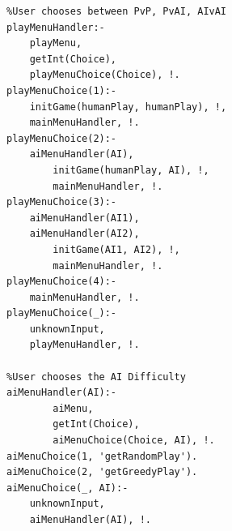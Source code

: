 \documentclass[a4paper]{article}
\begin{document}
\begin{lstlisting}
%User chooses between PvP, PvAI, AIvAI
playMenuHandler:-
	playMenu,
	getInt(Choice),
	playMenuChoice(Choice), !.
playMenuChoice(1):-
	initGame(humanPlay, humanPlay), !,
	mainMenuHandler, !.
playMenuChoice(2):-
	aiMenuHandler(AI),
        initGame(humanPlay, AI), !,
        mainMenuHandler, !.
playMenuChoice(3):-
	aiMenuHandler(AI1),
	aiMenuHandler(AI2),
        initGame(AI1, AI2), !,
        mainMenuHandler, !.
playMenuChoice(4):-
	mainMenuHandler, !.
playMenuChoice(_):-
	unknownInput,
	playMenuHandler, !.

%User chooses the AI Difficulty
aiMenuHandler(AI):-
        aiMenu,
        getInt(Choice),
        aiMenuChoice(Choice, AI), !.
aiMenuChoice(1, 'getRandomPlay').
aiMenuChoice(2, 'getGreedyPlay').
aiMenuChoice(_, AI):-
	unknownInput,
	aiMenuHandler(AI), !.
\end{lstlisting}
\newpage
\end{document}
